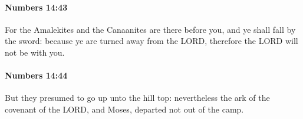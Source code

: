 		\paragraph{Numbers 14:43} %
			\label{NUMBERS-14-43}

			For the Amalekites and the Canaanites are there before you, and ye shall fall by the sword: because ye are turned away from the LORD, therefore the LORD will not be with you.


		\paragraph{Numbers 14:44} %
			\label{NUMBERS-14-44}

			But they presumed to go up unto the hill top: nevertheless the ark of the covenant of the LORD, and Moses, departed not out of the camp.


